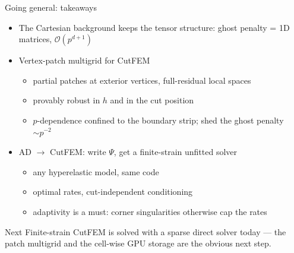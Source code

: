 \documentclass{beamer}
\begin{document}
\begin{frame}{Going general: takeaways}
    \begin{itemize}
        \item The \alert{Cartesian background} keeps the tensor structure: ghost penalty = 1D matrices, $\mathcal O(p^{d+1})$
        \item Vertex-patch multigrid for CutFEM
              \begin{itemize}
                  \item partial patches at exterior vertices, \alert{full-residual} local spaces
                  \item provably robust in $h$ and in the cut position
                  \item $p$-dependence confined to the boundary strip; shed the ghost penalty $\sim p^{-2}$
              \end{itemize}
        \item \alert{AD $\to$ CutFEM}: write $\Psi$, get a finite-strain unfitted solver
              \begin{itemize}
                  \item any hyperelastic model, same code
                  \item optimal rates, cut-independent conditioning
                  \item \alert{adaptivity is a must}: corner singularities otherwise cap the rates
              \end{itemize}
    \end{itemize}
    \vfill
    \pause
    \begin{block}{Next}
        Finite-strain CutFEM is solved with a sparse direct solver today --- the patch multigrid and the cell-wise GPU
        storage are the obvious next step.
    \end{block}
\end{frame}

\end{document}

